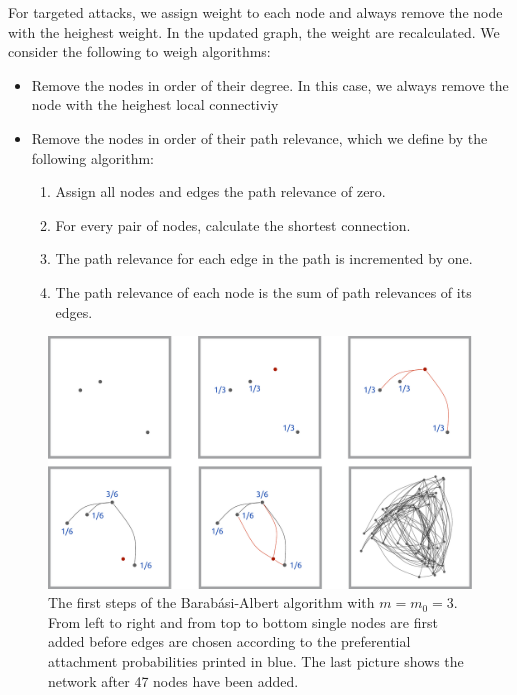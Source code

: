 \documentclass{scrartcl}
\begin{document}
For targeted attacks, we assign weight to each node and always remove the node with the heighest weight. In the updated graph, the weight are recalculated. We consider the following to weigh algorithms:
\begin{itemize}
\item Remove the nodes in order of their degree. In this case, we always remove the node with the heighest local connectiviy
\item Remove the nodes in order of their path relevance, which we define by the following algorithm:
	\begin{enumerate}
	\item Assign all nodes and edges the path relevance of zero.
	\item For every pair of nodes, calculate the shortest connection.
	\item The path relevance for each edge in the path is incremented by one.
	\item The path relevance of each node is the sum of path relevances of its edges.
	\end{enumerate}
\end{itemize}



\begin{figure}
    \includegraphics[width=\textwidth]{pictures/21_begin.pdf}
    \caption{The first steps of the Barab\'asi-Albert algorithm with $m
    = m_0 = 3$. From left to right and from top to bottom single nodes are
    first added before edges are chosen according to the preferential
    attachment probabilities printed in blue. The last picture shows the network
    after 47 nodes have been added.}
    \label{fig:21_begin}
\end{figure}
\end{document}

